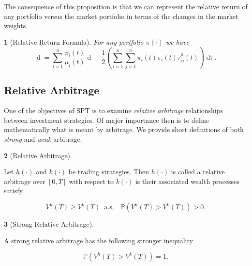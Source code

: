 \documentclass[british]{amsart} \usepackage{lmodern}
\numberwithin{equation}{section} \numberwithin{figure}{section}
\theoremstyle{plain} \newtheorem{thm}{\protect\theoremname}[section]
\theoremstyle{definition} \newtheorem{defn}[thm]{\protect\definitionname}
\theoremstyle{plain} \newtheorem{assumption}[thm]{\protect\assumptionname}
\theoremstyle{plain} \newtheorem{lem}[thm]{\protect\lemmaname}
\theoremstyle{plain} \newtheorem{prop}[thm]{\protect\propositionname}
\theoremstyle{remark} \newtheorem{rem}[thm]{\protect\remarkname}
\theoremstyle{plain} \newtheorem{cor}[thm]{\protect\corollaryname}
\renewcommand{\d}[1]{\mathop{\mathrm{d}{#1}}}
\begin{document}
The consequence of this proposition is that we can represent the relative 
return of any portfolio versus the market portfolio in terms of the changes 
in the market weights.

\begin{thm} [Relative Return Formula] For any portfolio $\pi(\cdot)$ we have
  \begin{equation*} 
    \d{ \log{ \left( \frac{ V^{\pi}(t) }{ V^{\mu}(t) } \right) }} = 
    \sum_{i=1}^{n} \frac{\pi_{i}(t)}{\mu_{i}(t)} \d{\mu_{i}(t)} -
    \frac{1}{2} \left( 
        \sum_{i=1}^{n} \sum_{j=1}^{n} \pi_{i}(t) \pi_{i}(t) \tau_{ij}^{\mu}(t)
    \right) \d{t}. 
  \end{equation*} 
\end{thm}


\subsection{Relative Arbitrage}

One of the objectives of SPT is to examine \textit{relative arbitrage}
relationships between investment strategies. Of major importance then is to
define mathematically what is meant by arbitrage. We provide short definitions
of both \textit{strong} and \textit{weak} arbitrage.

\begin{defn} [Relative Arbitrage]
  \label{def:defrelativearbitrage}

  Let $h(\cdot)$ and $k(\cdot)$ be trading strategies. Then $h(\cdot)$ is called
  a relative arbitrage over $[0,T]$ with respect to $k(\cdot)$ is their associated
  wealth processes satisfy

  \begin{equation}
    V^{h}(T)\ge V^{k}(T)\;\;\text{a.s},\;\;\;\mathbb{P}(V^{h}(T)>V^{k}(T))>0.
  \end{equation}

\end{defn}

\begin{defn} [Strong Relative Arbitrage]
  \label{def:defstrongrelativearbitrage}

  A strong relative arbitrage has the following stronger inequality

  \begin{equation}
    \mathbb{P}(V^{h}(T)>V^{k}(T))=1.
  \end{equation}

\end{defn}
\end{document}

